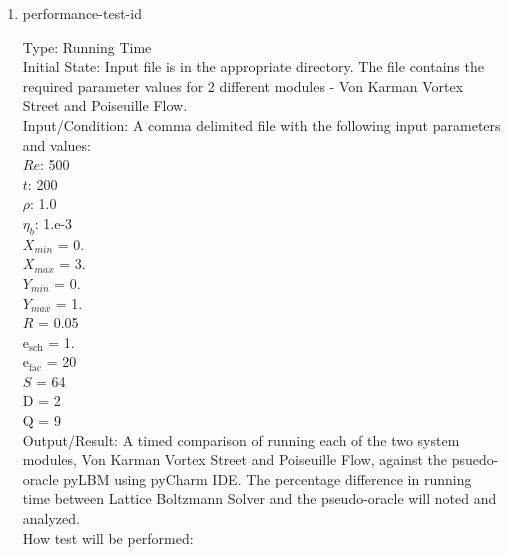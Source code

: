 \documentclass[12pt, titlepage]{article}
\newcommand{\famname}{Lattice Boltzmann Solver}
\newcounter{testcounter} %
\begin{document}
\begin{enumerate}

\item{performance-test-id\thetestcounter \\}

Type: Running Time\\
					
Initial State: Input file is in the appropriate directory. The file contains the
required parameter values for 2 different modules - Von Karman Vortex Street and
Poiseuille Flow.\\
					
Input/Condition: A comma delimited file with the following input parameters and values:\\
$Re$: 500\\
$t$: 200\\
$\rho$: 1.0\\
$\eta_b$: 1.e-3\\
$X_{min}$ = 0.\\
$X_{max}$ = 3.\\
$Y_{min}$ = 0.\\
$Y_{max}$ = 1.\\
$R$ = 0.05\\
$\mathrm{e_{sch}}$ = 1.\\
$\mathrm{e_{fac}}$ = 20\\
$S$ = 64\\
$\mathrm{D}$ = 2\\
$\mathrm{Q}$ = 9\\
					
Output/Result: A timed comparison of running
each of the two system modules, Von Karman Vortex Street and Poiseuille Flow,
against the psuedo-oracle pyLBM using pyCharm IDE. The percentage difference in
running time between {\famname} and the pseudo-oracle will noted and analyzed.\\

How test will be performed: 


\end{enumerate}
\end{document}
